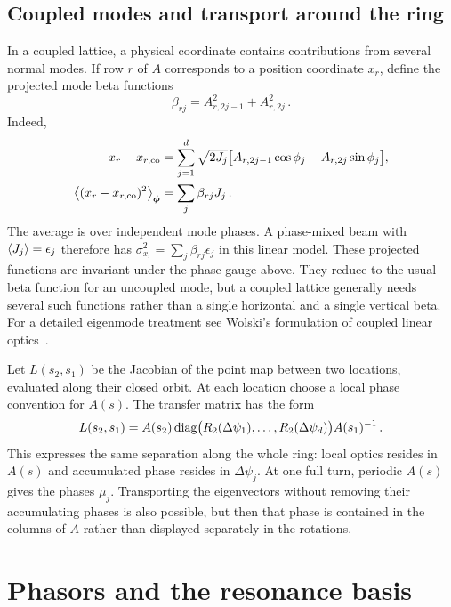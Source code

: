 \subsection{Coupled modes and transport around the ring}

In a coupled lattice, a physical coordinate contains contributions from
several normal modes. If row $r$ of $A$ corresponds to a position
coordinate $x_r$, define the projected mode beta functions
\begin{equation}\label{eq:lnf-mode-beta}
    \beta_{rj} = A_{r,2j-1}^2 + A_{r,2j}^2\,.
\end{equation}
Indeed,
\begin{align}
    x_r-x_{r,\rm co}
    & = \sum_{j = 1}^{d}\sqrt{2J_j}
    \bigl[A_{r,2j-1}\cos\phi_j-A_{r,2j}\sin\phi_j\bigr],\\
    \left\langle {(x_r-x_{r,\rm co})^2} \right\rangle_{\bm{\phi}}
    & = \sum_j\beta_{rj}J_j\,.
\end{align}
The average is over independent mode phases. A phase-mixed beam with
$\left\langle {J_j} \right\rangle = \epsilon_j$ therefore has
$\sigma_{x_r}^2 = \sum_j\beta_{rj}\epsilon_j$ in this linear model.
These projected functions are invariant under the phase gauge above.
They reduce to the usual beta function for an uncoupled mode, but a
coupled lattice generally needs several such functions rather than a
single horizontal and a single vertical beta.
For a detailed eigenmode treatment see Wolski's formulation of coupled
linear optics~\cite{WolskiCoupled2006}.

Let $L(s_2,s_1)$ be the Jacobian of the point map between two locations,
evaluated along their closed orbit. At each location choose a local
phase convention for $A(s)$. The transfer matrix has the form
\begin{equation}\label{eq:lnf-local-transport}
    L(s_2,s_1) = A(s_2)
    \operatorname{diag}\bigl(R_2(\Delta\psi_1),\ldots,R_2(\Delta\psi_d)\bigr)
    A(s_1)^{-1}\,.
\end{equation}
This expresses the same separation along the whole ring: local optics
resides in $A(s)$ and accumulated phase resides in $\Delta\psi_j$.
At one full turn, periodic $A(s)$ gives the phases $\mu_j$.
Transporting the eigenvectors without removing their accumulating phases
is also possible, but then that phase is contained in the columns of
$A$ rather than displayed separately in the rotations.



\section{Phasors and the resonance basis}
\label{sec:lnf-phasors}

